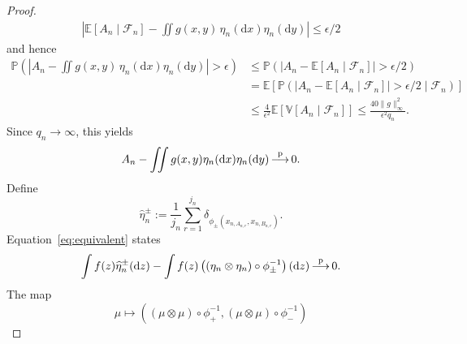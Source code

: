 \documentclass[english,11pt]{smfart}
\newcommand{\Prb}[1]{\mathbb{P}\left(#1\right)}
\newcommand{\Exb}[1]{\mathbb{E}\left[#1\right]}
\newcommand{\Vab}[1]{\mathbb{V}\left[#1\right]}
\newcommand{\convp}{\,{\buildrel \mathrm{p} \over \longrightarrow}\,}
\newcommand{\cF}{\mathcal{F}}
\newcommand{\cP}{\mathcal{P}}
\numberwithin{equation}{section}
\begin{document}
\begin{proof}
\begin{align*}
				\left| \Exb{A_n\mid\cF_n} -\iint g(x,y)\,\eta_n(\mathrm{d}x)\eta_n(\mathrm{d}y) \right| \le \epsilon/2
		\end{align*}
		and hence
		\begin{align*}
			\Prb{ \left| A_n- \iint g(x,y)\, \eta_n(\mathrm{d}x)\eta_n(\mathrm{d}y) \right|>\epsilon} &\le
			\Prb{ \left| A_n-\Exb{A_n\mid\cF_n} \right|>\epsilon/2 }\\
			&=\Exb{ \Prb{\left|A_n-\Exb{A_n\mid\cF_n}\right|>\epsilon/2\mid\cF_n}}\\
			&\le \frac{4}{\epsilon^2} \Exb{\Vab{A_n\mid\cF_n}} \le \frac{40\|g\|_\infty^2}{\epsilon^2q_n}.
		\end{align*}
		Since $q_n \to \infty$, this yields
		\begin{align}
			\label{eq:equivalent}
			A_n -  \iint g(x,y) \eta_n(\mathrm{d}x) \eta_n(\mathrm{d}y) \convp 0.
		\end{align}
		Define
		\[
			\widehat{\eta}_n^\pm := \frac{1}{j_n} \sum_{r=1}^{j_n} \delta_{\phi_\pm(x_{n,A_{n,r}},x_{n,B_{n,r}})}.
		\]
		Equation~\eqref{eq:equivalent} states
		\begin{align}
			\label{eq:tf}
			\int f(z)\widehat{\eta}_n^\pm(\mathrm{d}z) -  \int f(z) \left((\eta_n\otimes\eta_n)\circ\phi_\pm^{-1}\right)(\mathrm{d}z) \convp 0.
		\end{align}
		The map
		\[
			\mu \mapsto \left( (\mu\otimes\mu)\circ\phi_+^{-1}, (\mu\otimes\mu)\circ\phi_-^{-1}\right)
		\]

\end{proof}
\end{document}
